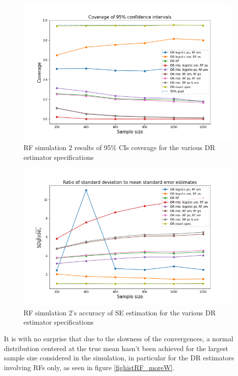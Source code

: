 \documentclass[12pt,twoside]{article}
\begin{document}
\begin{figure}[h!]
    \centering
    \includegraphics[width = 0.9\columnwidth]{figures/CIRF_moreW.png}
    \caption{RF simulation 2 results of 95\% CIs coverage for the various DR estimator specifications}
    \label{figCIRF_moreW}
\end{figure}

\begin{figure}[h!]
    \centering
    \includegraphics[width = 0.9\columnwidth]{figures/SERF_moreW.png}
    \caption{RF simulation 2's accuracy of \citet{lunceford_davidian} SE estimation for the various DR estimator specifications}
    \label{figSERF_moreW}
\end{figure}

It is with no surprise that due to the slowness of the convergences, a normal distribution centered at the true mean hasn't been achieved for the largest sample size considered in the simulation, in particular for the DR estimators involving RFs only, as seen in figure \ref{fighistRF_moreW}. \\
\end{document}
